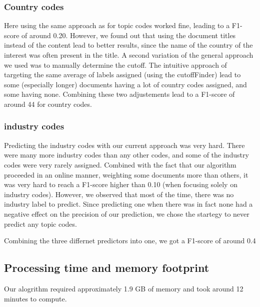 \documentclass{article}
\begin{document}
            \subsubsection{ Country codes }
                Here using the same approach as for topic codes worked fine, leading to a F1-score of around 0.20. However, we found out that using the document titles instead of the content lead to better results, since the name of the country of the interest was often present in the title. A second variation of the general approach we used was to manually determine the cutoff. The intuitive approach of targeting the same average of labels assigned (using the cutoffFinder) lead to some (especially longer) documents having a lot of country codes assigned, and some having none.
                    Combining these two adjustements lead to a F1-score of around 44 for country codes.


            \subsubsection{industry codes }
            Predicting the industry codes with our current approach was very hard. There were many more industry codes than any other codes, and some of the industry codes were very rarely assigned.  Combined with the fact that our algorithm proceeded in an online manner, weighting some documents more than others, it was very hard to reach a F1-score higher than 0.10 (when focusing solely on industry codes). However, we observed that most of the time, there was no industry label to predict. Since predicting one when there was in fact none had a negative effect on the precision of our prediction, we chose the startegy to never predict any topic codes.

            Combining the three differnet predictors into one, we got a F1-score of around 0.4

    \subsection{Processing time and memory footprint}
        Our alogrithm required approximately 1.9 GB of memory and took around 12 minutes to compute.
\end{document}
